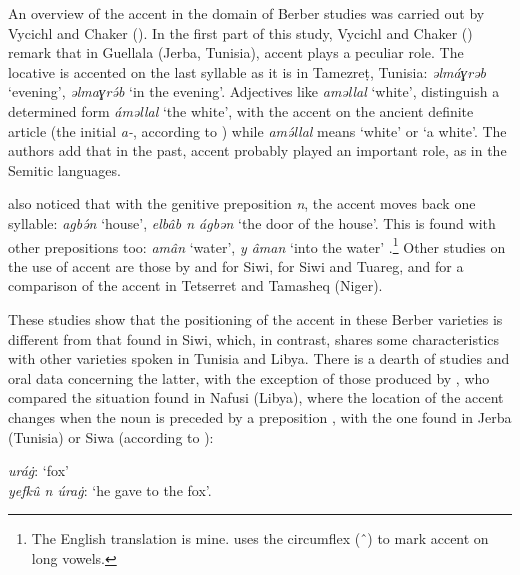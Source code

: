 \documentclass[output=paper]{langsci/langscibook}
\begin{document}
An overview of the accent in the domain of Berber studies was carried out by Vycichl and Chaker (\citeyear[][103-106]{vycichl:chaker:84}). In the first part of this study, 
Vycichl and Chaker (\citeyear[][103-105]{vycichl:chaker:84}) remark that in Guellala (Jerba, Tunisia), accent plays a peculiar role. The locative is accented on the last syllable as it is in Tamezreṭ, Tunisia: {\emph{əlmáɣrəb}} `evening', {\emph{əlmaɣrə́b}} `in the evening'. Adjectives like {\emph{aməllal}} `white', distinguish a determined form {\emph{áməllal}} `the white', with the accent on the ancient definite article (the initial {\emph{a-}}, according to \citealt{vycichl:chaker:84}) while {\emph{amə́llal}} means `white' or `a white'. The authors add that in the past, accent probably played an important role, as in the Semitic languages.

\cite{vycichl:chaker:84} also noticed that with the genitive preposition {\emph{n}}, the accent moves back one syllable: {\emph{agbə́n}} `house', {\emph{elbâb n ágbən}} `the door of the house'. This is found with other prepositions too: {\emph{amân}} `water', {\emph{y âman}} `into the water' \citep[][180-181]{vycichl:81}.\footnote{The English translation is mine. \cite[][180-181]{vycichl:81} uses the circumflex (ˆ) to mark accent on long vowels.} Other studies on the use of accent are those by \cite{louali:03} and \cite{louali:philippson:04} for Siwi, \cite{louali:philippson:05} for Siwi and Tuareg, and \cite{lux:philippson:10} for a comparison of the accent in Tetserret and Tamasheq (Niger).

These studies show that the positioning of the accent in these Berber varieties is different from that found in Siwi, which, in contrast, shares some characteristics with other varieties spoken in Tunisia and Libya. There is a dearth of studies and oral data concerning the latter, with the exception of those produced by \cite{brugnatelli:86,brugnatelli:05}, who compared the situation found in Nafusi (Libya), where the location of the accent changes when the noun is preceded by a preposition \citep[][12]{beguinot:42}, with the one found in Jerba (Tunisia) or Siwa (according to \citealt{vycichl:chaker:84}):

\begin{exe}
\exi{} 
{\emph{uráġ}}: `fox' \\
{\emph{yefkû n úraġ}}: `he gave to the fox'.
\end{exe}
\end{document}
